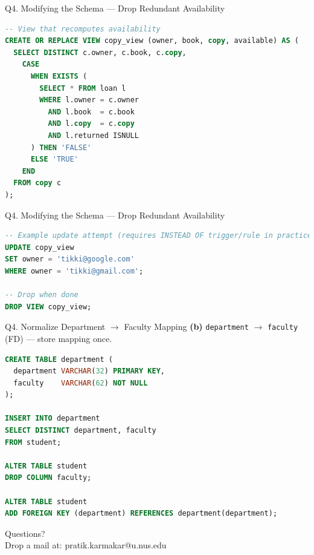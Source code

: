 \documentclass{beamer}
\begin{document}
\begin{frame}[fragile]{Q4. Modifying the Schema — Drop Redundant Availability}
\begin{lstlisting}[language=SQL]
-- View that recomputes availability
CREATE OR REPLACE VIEW copy_view (owner, book, copy, available) AS (
  SELECT DISTINCT c.owner, c.book, c.copy,
    CASE
      WHEN EXISTS (
        SELECT * FROM loan l
        WHERE l.owner = c.owner
          AND l.book  = c.book
          AND l.copy  = c.copy
          AND l.returned ISNULL
      ) THEN 'FALSE'
      ELSE 'TRUE'
    END
  FROM copy c
);
\end{lstlisting}
\end{frame}
\begin{frame}[fragile]{Q4. Modifying the Schema — Drop Redundant Availability}
\begin{lstlisting}[language=SQL]
-- Example update attempt (requires INSTEAD OF trigger/rule in practice)
UPDATE copy_view
SET owner = 'tikki@google.com'
WHERE owner = 'tikki@gmail.com';

-- Drop when done
DROP VIEW copy_view;
\end{lstlisting}
\end{frame}

\begin{frame}[fragile]{Q4. Normalize Department \texorpdfstring{$\to$}{->} Faculty Mapping}
\textbf{(b)} \texttt{department} $\to$ \texttt{faculty} (FD) — store mapping once.
\begin{lstlisting}[language=SQL]
CREATE TABLE department (
  department VARCHAR(32) PRIMARY KEY,
  faculty    VARCHAR(62) NOT NULL
);

INSERT INTO department
SELECT DISTINCT department, faculty
FROM student;

ALTER TABLE student
DROP COLUMN faculty;

ALTER TABLE student
ADD FOREIGN KEY (department) REFERENCES department(department);
\end{lstlisting}
\end{frame}

\begin{frame}
\begin{center}
Questions?\\
Drop a mail at: pratik.karmakar@u.nus.edu
\end{center}
\end{frame}
\end{document}
